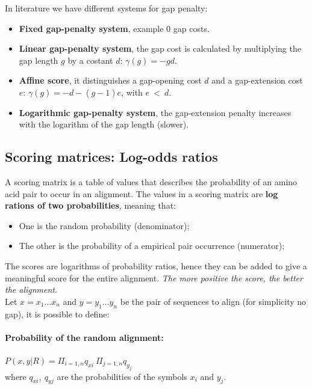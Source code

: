 In literature we have different systems for gap penalty:
\begin{itemize}
	\item \textbf{Fixed gap-penalty system}, example $0$ gap costs.
	\item \textbf{Linear gap-penalty system}, the gap cost is calculated by multiplying the gap length $g$ by a costant $d$: $\gamma(g) = -gd$.
	\item \textbf{Affine score}, it distinguishes a gap-opening cost $d$ and a gap-extension cost $e$: $\gamma(g) = -d - (g-1)e$, with $e~<~d$.
	
	\item \textbf{Logarithmic gap-penalty system}, the gap-extension penalty increases with the logarithm of the gap length (slower).
\end{itemize}



\subsection{Scoring matrices: Log-odds ratios}
A scoring matrix is a table of values that describes the probability of an amino acid pair to occur in an alignment. The values in a scoring matrix are \textbf{log rations of two probabilities},  meaning that:
\begin{itemize}
	\item One is the random probability (denominator);
	\item The other is the probability of a empirical pair occurrence (numerator);
\end{itemize}
The scores are logarithms of probability ratios, hence they can be added to give a meaningful score for the entire alignment. \textit{The more positive the score, the better the alignment}.\\
Let $x = x_1 \dots x_n$ and $y = y_1 \dots y_n$ be the pair of sequences to align (for simplicity no gap), it is possible to define:

\paragraph{Probability of the random alignment:} $P(x,y|R) = \Pi_{i = 1,n}{q_{xi}}~ \Pi_{j = 1,n}{q_{y_j}}$  \\
where $q_{xi},~q_{yj}$ are the probabilities of the symbols $x_i$ and $y_j$.

